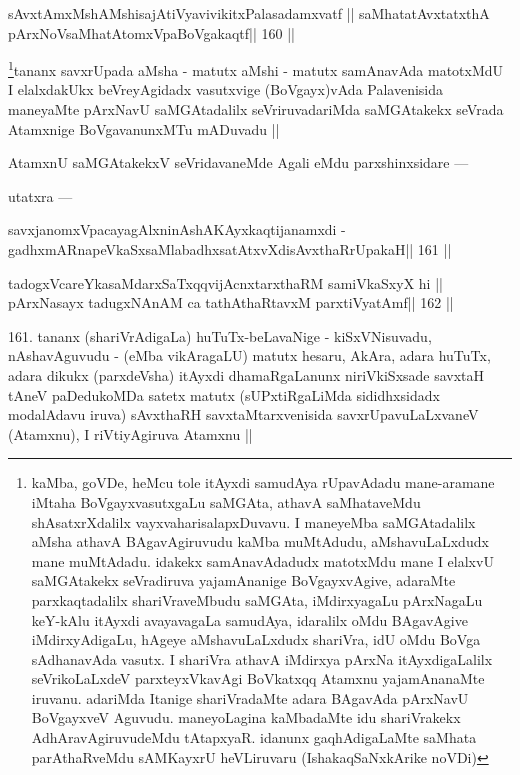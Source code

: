 \begin{shl}
sAvxtAmxMshAMshisajAtiVyavivikitxPalasadamxvatf ||
saMhatatAvxtatxthA pArxNoV\s saMhatAtomxVpaBoVgakaqtf\hfill || 160 ||
\end{shl}

\begin{artha}
\footnote[8]{kaMba, goVDe, heMcu tole itAyxdi samudAya rUpavAdadu 
mane-aramane iMtaha BoVgayxvasutxgaLu saMGAta, athavA saMhataveMdu 
shAsatxrXdalilx vayxvaharisalapxDuvavu. I maneyeMba saMGAtadalilx aMsha 
athavA BAgavAgiruvudu kaMba muMtAdudu, aMshavuLaLxdudx mane muMtAdadu. 
idakekx samAnavAdadudx matotxMdu mane I elalxvU saMGAtakekx seVradiruva 
yajamAnanige BoVgayxvAgive, adaraMte parxkaqtadalilx shariVraveMbudu 
saMGAta, iMdirxyagaLu pArxNagaLu keY-kAlu itAyxdi avayavagaLa samudAya, 
idaralilx oMdu BAgavAgive iMdirxyAdigaLu, hAgeye aMshavuLaLxdudx 
shariVra, idU oMdu BoVga sAdhanavAda vasutx. I shariVra athavA iMdirxya 
pArxNa itAyxdigaLalilx seVrikoLaLxdeV parxteyxVkavAgi BoVkatxqq Atamxnu yajamAnanaMte iruvanu. adariMda Itanige shariVradaMte adara BAgavAda pArxNavU BoVgayxveV Aguvudu. maneyoLagina kaMbadaMte idu shariVrakekx AdhAravAgiruvudeMdu tAtapxyaR. idanunx gaqhAdigaLaMte saMhata parAthaRveMdu sAMKayxrU heVLiruvaru (IshakaqSaNxkArike noVDi)}tananx savxrUpada aMsha - matutx aMshi - matutx samAnavAda matotxMdU I elalxdakUkx beVreyAgidadx vasutxvige (BoVgayx)vAda Palavenisida maneyaMte pArxNavU saMGAtadalilx seVriruvadariMda saMGAtakekx seVrada Atamxnige BoVgavanunxMTu mADuvadu ||
\end{artha}

\begin{artha}
AtamxnU saMGAtakekxV seVridavaneMde Agali eMdu parxshinxsidare ---
\end{artha}

\begin{artha}
utatxra ---
\end{artha}

\begin{shl}
savxjanomxVpacayagAlxninAshAKAyxkaqtijanamxdi -
gadhxmARnapeVkaSxsaMlabadhxsatAtxvXdisAvxthaRrUpakaH\hfill || 161 ||
\end{shl}

\begin{shl}
tadogxVcareYkasaMdarxSaTxqqvijAcnxtarxthaRM samiVkaSxyX hi ||
pArxNasayx tadugxNAnAM ca tathAthaRtavxM parxtiVyatAmf\hfill || 162 ||
\end{shl}

\begin{artha}
161. tananx (shariVrAdigaLa) huTuTx-beLavaNige - kiSxVNisuvadu, 
nAshavAguvudu - (eMba vikAragaLU) matutx hesaru, AkAra, adara huTuTx, adara dikukx (parxdeVsha) itAyxdi dhamaRgaLanunx niriVkiSxsade savxtaH tAneV paDedukoMDa satetx  matutx (sUPxtiRgaLiMda sididhxsidadx modalAdavu iruva) sAvxthaRH savxtaMtarxvenisida savxrUpavuLaLxvaneV (Atamxnu), I riVtiyAgiruva Atamxnu ||
\end{artha}


